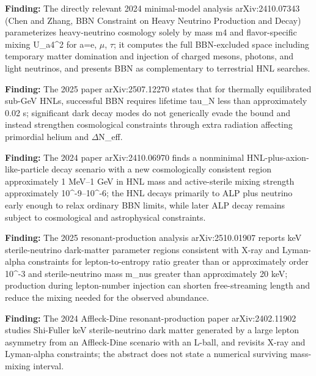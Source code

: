\documentclass[11pt,a4paper]{article}
\begin{document}
\textbf{Finding:} The directly relevant 2024 minimal-model analysis arXiv:2410.07343 (Chen and Zhang, BBN Constraint on Heavy Neutrino Production and Decay) parameterizes heavy-neutrino cosmology solely by mass m4 and flavor-specific mixing \textbar{}U\_a4\textbar{}\textasciicircum{}2 for a=e, $\mu$, $\tau$; it computes the full BBN-excluded space including temporary matter domination and injection of charged mesons, photons, and light neutrinos, and presents BBN as complementary to terrestrial HNL searches.

\textbf{Finding:} The 2025 paper arXiv:2507.12270 states that for thermally equilibrated sub-GeV HNLs, successful BBN requires lifetime tau\_N less than approximately 0.02 s; significant dark decay modes do not generically evade the bound and instead strengthen cosmological constraints through extra radiation affecting primordial helium and $\Delta$N\_eff.

\textbf{Finding:} The 2024 paper arXiv:2410.06970 finds a nonminimal HNL-plus-axion-like-particle decay scenario with a new cosmologically consistent region approximately 1 MeV--1 GeV in HNL mass and active-sterile mixing strength approximately 10\textasciicircum{}-9--10\textasciicircum{}-6; the HNL decays primarily to ALP plus neutrino early enough to relax ordinary BBN limits, while later ALP decay remains subject to cosmological and astrophysical constraints.

\textbf{Finding:} The 2025 resonant-production analysis arXiv:2510.01907 reports keV sterile-neutrino dark-matter parameter regions consistent with X-ray and Lyman-alpha constraints for lepton-to-entropy ratio greater than or approximately order 10\textasciicircum{}-3 and sterile-neutrino mass m\_nus greater than approximately 20 keV; production during lepton-number injection can shorten free-streaming length and reduce the mixing needed for the observed abundance.

\textbf{Finding:} The 2024 Affleck-Dine resonant-production paper arXiv:2402.11902 studies Shi-Fuller keV sterile-neutrino dark matter generated by a large lepton asymmetry from an Affleck-Dine scenario with an L-ball, and revisits X-ray and Lyman-alpha constraints; the abstract does not state a numerical surviving mass-mixing interval.
\end{document}
